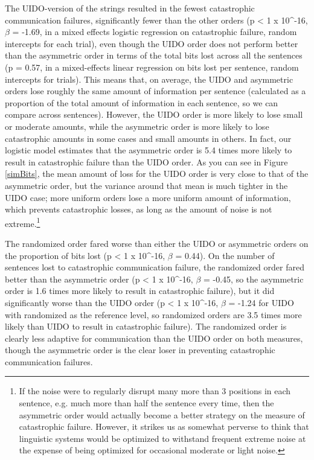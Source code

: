 \documentclass[12pt]{article}
\begin{document}
The UIDO-version of the strings resulted in the fewest catastrophic communication failures, significantly fewer than the other orders (p < 1 x 10^{-16}, $\beta$ = -1.69, in a mixed effects logistic regression on catastrophic failure, random intercepts for each trial), even though the UIDO order does not perform better than the asymmetric order in terms of the total bits lost across all the sentences (p = 0.57, in a mixed-effects linear regression on bits lost per sentence, random intercepts for trials). This means that, on average, the UIDO and asymmetric orders lose roughly the same amount of information per sentence (calculated as a proportion of the total amount of information in each sentence, so we can compare across sentences). However, the UIDO order is more likely to lose small or moderate amounts, while the asymmetric order is more likely to lose catastrophic amounts in some cases and small amounts in others.  In fact, our logistic model estimates that the asymmetric order is 5.4 times more likely to result in catastrophic failure than the UIDO order. As you can see in Figure \ref{simBits}, the mean amount of loss for the UIDO order is very close to that of the asymmetric order, but the variance around that mean is much tighter in the UIDO case; more uniform orders lose a more uniform amount of information, which prevents catastrophic losses, as long as the amount of noise is not extreme.\footnote{If the noise were to regularly disrupt many more than 3 positions in each sentence, e.g. much more than half the sentence every time, then the asymmetric order would actually become a better strategy on the measure of catastrophic failure. However, it strikes us as somewhat perverse to think that linguistic systems would be optimized to withstand frequent extreme noise at the expense of being optimized for occasional moderate or light noise.}

The randomized order fared worse than either the UIDO or asymmetric orders on the proportion of bits lost (p < 1 x 10^{-16}, $\beta$ = 0.44). On the number of sentences lost to catastrophic communication failure, the randomized order fared better than the asymmetric order (p < 1 x 10^{-16}, $\beta$ = -0.45, so the asymmetric order is 1.6 times more likely to result in catastrophic failure), but it did significantly worse than the UIDO order (p < 1 x 10^{-16}, $\beta$ = -1.24 for UIDO with randomized as the reference level, so randomized orders are 3.5 times more likely than UIDO to result in catastrophic failure). The randomized order is clearly less adaptive for communication than the UIDO order on both measures, though the asymmetric order is the clear loser in preventing catastrophic communication failures.
\end{document}
